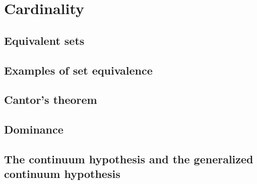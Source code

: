 \chapter{Cardinality}
\label{ch:card}


\section{Equivalent sets}
\label{sec:equiv_sets}




\newpage

\section{Examples of set equivalence}




\newpage

\section{Cantor's theorem}
\label{sec:cantors_thm}




\newpage

\section{Dominance}




\newpage

\section[CH and GCH]{The continuum hypothesis and the generalized continuum hypothesis}


 

